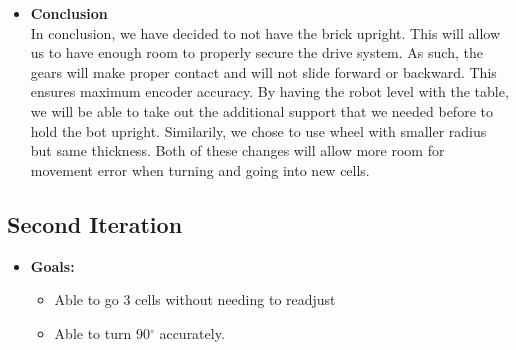 \documentclass[11pt]{article}
\begin{document}
\begin{itemize}
\begin{itemize}
	\end{itemize}
\item \textbf{Conclusion}\\
In conclusion, we have decided to not have the brick upright. This will allow us to have enough room to properly secure the drive system. As such, the gears will make proper contact and will not slide forward or backward. This ensures maximum encoder accuracy. By having the robot level with the table, we will be able to take out the additional support that we needed before to hold the bot upright. Similarily, we chose to use wheel with smaller radius but same thickness. Both of these changes will allow more room for movement error when turning and going into new cells.
\end{itemize}
\newpage

\subsection{Second Iteration}
\begin{itemize}
\item \textbf{Goals:}
	\begin{itemize}
	\item Able to go 3 cells without needing to readjust
	\item Able to turn 90$^{\circ}$ accurately.
	\end{itemize}
\end{itemize}
\end{document}
